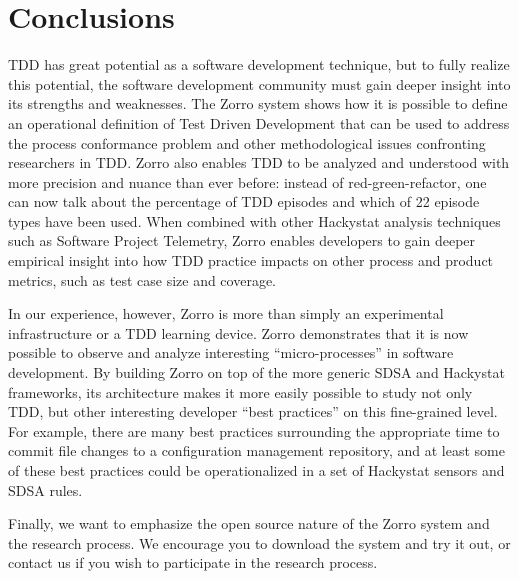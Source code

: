 \documentclass[11pt,twocolumn]{article}
\begin{document}
\section{Conclusions}
\label{sec:conclusions}

TDD has great potential as a software development technique, but to fully
realize this potential, the software development community must gain deeper
insight into its strengths and weaknesses.  The Zorro system shows how it
is possible to define an operational definition of Test Driven Development
that can be used to address the process conformance problem and other
methodological issues confronting researchers in TDD.  Zorro also enables
TDD to be analyzed and understood with more precision and nuance than ever
before: instead of red-green-refactor, one can now talk about the
percentage of TDD episodes and which of 22 episode types have been used.
When combined with other Hackystat analysis techniques such as Software
Project Telemetry, Zorro enables developers to gain deeper empirical
insight into how TDD practice impacts on other process and product metrics,
such as test case size and coverage.

In our experience, however, Zorro is more than simply an experimental
infrastructure or a TDD learning device.  Zorro demonstrates that it is now
possible to observe and analyze interesting ``micro-processes'' in software
development.  By building Zorro on top of the more generic SDSA and
Hackystat frameworks, its architecture makes it more easily possible to
study not only TDD, but other interesting developer ``best practices'' on
this fine-grained level.  For example, there are many best practices
surrounding the appropriate time to commit file changes to a configuration
management repository, and at least some of these best practices could be
operationalized in a set of Hackystat sensors and SDSA rules. 

Finally, we want to emphasize the open source nature of the Zorro system and 
the research process.   We encourage you to download the system and try it out,
or contact us if you wish to participate in the research process. 



\end{document}
